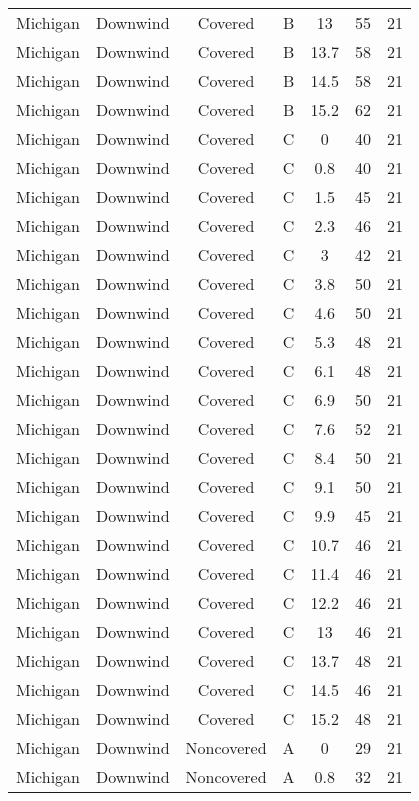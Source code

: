 \documentclass{article}
\begin{document}
\begin{longtable}[H]{ccccccc}
Michigan & Downwind & Covered     & B & 13   & 55 & 21 \\
Michigan & Downwind & Covered     & B & 13.7 & 58 & 21 \\
Michigan & Downwind & Covered     & B & 14.5 & 58 & 21 \\
Michigan & Downwind & Covered     & B & 15.2 & 62 & 21 \\
Michigan & Downwind & Covered     & C & 0    & 40 & 21 \\
Michigan & Downwind & Covered     & C & 0.8  & 40 & 21 \\
Michigan & Downwind & Covered     & C & 1.5  & 45 & 21 \\
Michigan & Downwind & Covered     & C & 2.3  & 46 & 21 \\
Michigan & Downwind & Covered     & C & 3    & 42 & 21 \\
Michigan & Downwind & Covered     & C & 3.8  & 50 & 21 \\
Michigan & Downwind & Covered     & C & 4.6  & 50 & 21 \\
Michigan & Downwind & Covered     & C & 5.3  & 48 & 21 \\
Michigan & Downwind & Covered     & C & 6.1  & 48 & 21 \\
Michigan & Downwind & Covered     & C & 6.9  & 50 & 21 \\
Michigan & Downwind & Covered     & C & 7.6  & 52 & 21 \\
Michigan & Downwind & Covered     & C & 8.4  & 50 & 21 \\
Michigan & Downwind & Covered     & C & 9.1  & 50 & 21 \\
Michigan & Downwind & Covered     & C & 9.9  & 45 & 21 \\
Michigan & Downwind & Covered     & C & 10.7 & 46 & 21 \\
Michigan & Downwind & Covered     & C & 11.4 & 46 & 21 \\
Michigan & Downwind & Covered     & C & 12.2 & 46 & 21 \\
Michigan & Downwind & Covered     & C & 13   & 46 & 21 \\
Michigan & Downwind & Covered     & C & 13.7 & 48 & 21 \\
Michigan & Downwind & Covered     & C & 14.5 & 46 & 21 \\
Michigan & Downwind & Covered     & C & 15.2 & 48 & 21 \\
Michigan & Downwind & Noncovered & A & 0    & 29 & 21 \\
Michigan & Downwind & Noncovered & A & 0.8  & 32 & 21 \\

\end{longtable}
\end{document}
